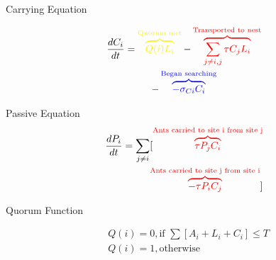 \documentclass{beamer}
\makeatletter
\def\mcolor#1#{\@mcolor{#1}}
\def\@mcolor#1#2#3{%
  \protect\leavevmode
  \begingroup
    \color#1{#2}#3%
  \endgroup
}
\newcommand{\annotate}[3]{
\mcolor{#1}{\overbrace{#3}^\text{#2}}
}
\makeatother
\begin{document}
\begin{frame}{Carrying Equation}

\begin{multline}
    \frac{dC_i}{dt} = \annotate{yellow}{Quorum met}{Q(i)L_i} - \annotate{red}{Transported to nest}{\sum_{j \neq i, j} \tau C_jL_i} \\
    - \annotate{blue}{Began searching}{- \sigma_{Ci}C_i}
\end{multline}


\end{frame}

\begin{frame}{Passive Equation}
\begin{equation}
\begin{aligned}
    \frac{dP_i}{dt} = \sum_{j \neq i} [\annotate{red}{Ants carried to site i from site j}{\tau P_j C_i} \\ \annotate{red}{Ants carried to site j from site i}{- \tau P_i C_j}]
\end{aligned}
\end{equation}

\end{frame}

\begin{frame}{Quorum Function}


\begin{equation}
\begin{aligned}
  & Q(i) = 0, \text{if    } \sum [A_i + L_i + C_i] \leq T \\
  & Q(i) = 1, \text{otherwise} \\
\end{aligned}
\end{equation}
\end{frame}
\end{document}
